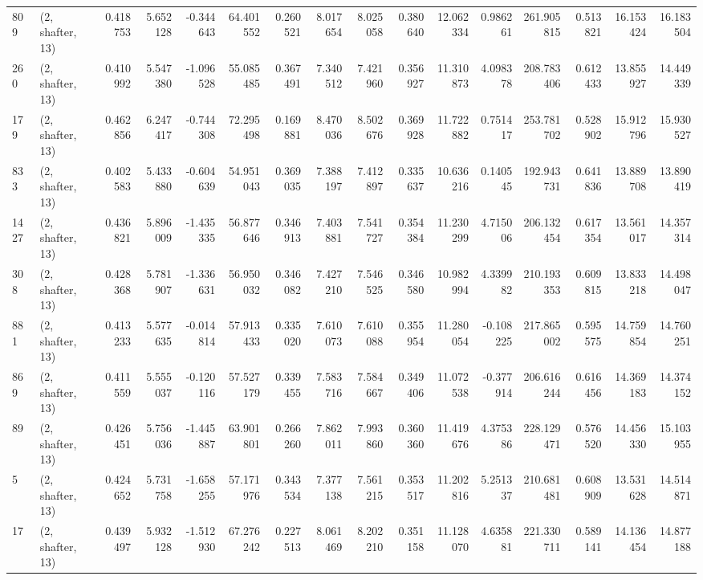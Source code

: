 \begin{tabular}{llrrrrrrrrrrrrrr}
809  &  (2, shafter, 13) &   0.418753 &   5.652128 &  -0.344643 &     64.401552 &    0.260521 &    8.017654 &    8.025058 &  0.380640 &  12.062334 &   0.986261 &   261.905815 &   0.513821 &  16.153424 &  16.183504 \\
260  &  (2, shafter, 13) &   0.410992 &   5.547380 &  -1.096528 &     55.085485 &    0.367491 &    7.340512 &    7.421960 &  0.356927 &  11.310873 &   4.098378 &   208.783406 &   0.612433 &  13.855927 &  14.449339 \\
179  &  (2, shafter, 13) &   0.462856 &   6.247417 &  -0.744308 &     72.295498 &    0.169881 &    8.470036 &    8.502676 &  0.369928 &  11.722882 &   0.751417 &   253.781702 &   0.528902 &  15.912796 &  15.930527 \\
833  &  (2, shafter, 13) &   0.402583 &   5.433880 &  -0.604639 &     54.951043 &    0.369035 &    7.388197 &    7.412897 &  0.335637 &  10.636216 &   0.140545 &   192.943731 &   0.641836 &  13.889708 &  13.890419 \\
1427 &  (2, shafter, 13) &   0.436821 &   5.896009 &  -1.435335 &     56.877646 &    0.346913 &    7.403881 &    7.541727 &  0.354384 &  11.230299 &   4.715006 &   206.132454 &   0.617354 &  13.561017 &  14.357314 \\
308  &  (2, shafter, 13) &   0.428368 &   5.781907 &  -1.336631 &     56.950032 &    0.346082 &    7.427210 &    7.546525 &  0.346580 &  10.982994 &   4.339982 &   210.193353 &   0.609815 &  13.833218 &  14.498047 \\
881  &  (2, shafter, 13) &   0.413233 &   5.577635 &  -0.014814 &     57.913433 &    0.335020 &    7.610073 &    7.610088 &  0.355954 &  11.280054 &  -0.108225 &   217.865002 &   0.595575 &  14.759854 &  14.760251 \\
869  &  (2, shafter, 13) &   0.411559 &   5.555037 &  -0.120116 &     57.527179 &    0.339455 &    7.583716 &    7.584667 &  0.349406 &  11.072538 &  -0.377914 &   206.616244 &   0.616456 &  14.369183 &  14.374152 \\
89   &  (2, shafter, 13) &   0.426451 &   5.756036 &  -1.445887 &     63.901801 &    0.266260 &    7.862011 &    7.993860 &  0.360360 &  11.419676 &   4.375386 &   228.129471 &   0.576520 &  14.456330 &  15.103955 \\
5    &  (2, shafter, 13) &   0.424652 &   5.731758 &  -1.658255 &     57.171976 &    0.343534 &    7.377138 &    7.561215 &  0.353517 &  11.202816 &   5.251337 &   210.681481 &   0.608909 &  13.531628 &  14.514871 \\
17   &  (2, shafter, 13) &   0.439497 &   5.932128 &  -1.512930 &     67.276242 &    0.227513 &    8.061469 &    8.202210 &  0.351158 &  11.128070 &   4.635881 &   221.330711 &   0.589141 &  14.136454 &  14.877188 \\

\end{tabular}
